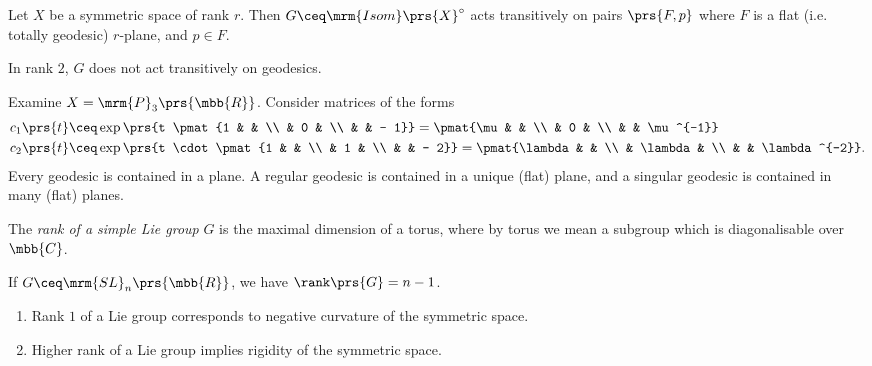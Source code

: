 \documentclass[10pt, twoside]{book}
\begin{document}
\begin{fact}
Let $X$ be a symmetric space of rank $r$. Then $G \ceq \mrm{Isom}\prs{X}^\circ$ acts transitively on pairs $\prs{F,p}$ where $F$ is a flat (i.e. totally geodesic) $r$-plane, and $p \in F$.
\end{fact}

\begin{fact}
In rank $2$, $G$ does not act transitively on geodesics.
\end{fact}

\begin{example}
Examine $X = \mrm{P}_3\prs{\mbb{R}}$. Consider matrices of the forms
\begin{align*}
c_1\prs{t} &\ceq \exp\prs{t \pmat{1 & & \\ & 0 & \\ & & - 1}} = \pmat{\mu & & \\ & 0 & \\ & & \mu^{-1}} \\
c_2\prs{t} &\ceq \exp\prs{t \cdot \pmat{1 & & \\ & 1 & \\ & & - 2}} = \pmat{\lambda & & \\ & \lambda & \\ & & \lambda^{-2}} \text{.}
\end{align*}
Every geodesic is contained in a plane. A regular geodesic is contained in a unique (flat) plane, and a singular geodesic is contained in many (flat) planes.
\end{example}

\begin{definition}
The \emph{rank of a simple Lie group} $G$ is the maximal dimension of a torus, where by torus we mean a subgroup which is diagonalisable over $\mbb{C}$.
\end{definition}

\begin{example}
If $G \ceq \mrm{SL}_n\prs{\mbb{R}}$, we have $\rank \prs{G} = n-1$.
\end{example}

\begin{fact}
\begin{enumerate}
\item Rank $1$ of a Lie group corresponds to negative curvature of the symmetric space.
\item Higher rank of a Lie group implies rigidity of the symmetric space.
\end{enumerate}
\end{fact}
\end{document}
